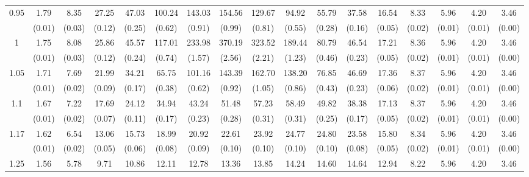 \documentclass[12pt]{article}  %
\theoremstyle{plain}
\begin{document}
\begin{sidewaystable}[htbp]
\begin{tabular}{ccccccccccccccccc}
\multirow{2}{*}{0.95}  & 1.79& 8.35& 27.25& 47.03& 100.24& 143.03& 154.56 &129.67  &94.92 &55.79& 37.58 &16.54 & 8.33 & 5.96&  4.20 & 3.46\\
                      & (0.01)& (0.03)& (0.12)& (0.25)& (0.62)& (0.91)& (0.99)& (0.81)& (0.55)&  (0.28)&  (0.16)&  (0.05)&  (0.02)&  (0.01)&  (0.01)&    (0.00)\\ \hline
\multirow{2}{*}{1}  & 1.75 &8.08& 25.86 &45.57& 117.01& 233.98& 370.19 &323.52& 189.44& 80.79 &46.54& 17.21&  8.36 & 5.96 & 4.20 & 3.46\\
                      & (0.01)& (0.03)& (0.12)& (0.24)& (0.74)& (1.57)& (2.56)& (2.21)& (1.23)&  (0.46)&  (0.23)&  (0.05)&  (0.02)&  (0.01)&  (0.01)&     (0.00)\\ \hline                                                                     
\multirow{2}{*}{1.05}  &1.71 &7.69&21.99 &34.21  &65.75& 101.16& 143.39 &162.70& 138.20& 76.85 &46.69& 17.36 & 8.37 & 5.96 & 4.20 & 3.46\\
                      & (0.01)& (0.02)& (0.09)& (0.17)& (0.38)& (0.62)& (0.92)& (1.05)& (0.86)&  (0.43)&  (0.23)&  (0.06)&  (0.02)&  (0.01)&  (0.01)&     (0.00)\\ \hline                                                                                                                                          
\multirow{2}{*}{1.1}  &1.67& 7.22& 17.69& 24.12& 34.94 & 43.24 & 51.48 & 57.23 & 58.49& 49.82& 38.38& 17.13 & 8.37 & 5.96 & 4.20 & 3.46\\
                      &  (0.01)& (0.02)& (0.07)& (0.11)& (0.17)& (0.23)& (0.28)& (0.31)& (0.31)&  (0.25)&  (0.17)&  (0.05)&  (0.02)&  (0.01)&  (0.01)&     (0.00)\\ \hline
\multirow{2}{*}{1.17}  &1.62& 6.54& 13.06& 15.73 & 18.99 & 20.92 & 22.61 & 23.92 & 24.77 &24.80& 23.58& 15.80 & 8.34 & 5.96 & 4.20 & 3.46\\
                      &  (0.01)& (0.02)& (0.05)& (0.06)& (0.08)& (0.09)& (0.10)& (0.10)& (0.10)&  (0.10)&  (0.08)&  (0.05)&  (0.02)&  (0.01)&  (0.01)&   (0.00)\\ \hline                                                                                                                                                                                                                                                                                    
                                                                     \multirow{2}{*}{1.25}  &1.56& 5.78 & 9.71& 10.86 & 12.11 & 12.78 & 13.36 & 13.85 & 14.24 &14.60 &14.64 &12.94  &8.22  &5.96 & 4.20&  3.46\\

\end{tabular}
\end{sidewaystable}
\end{document}
